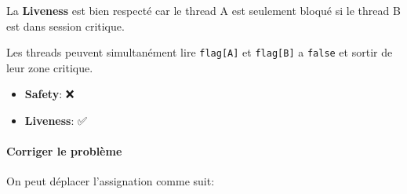 \begin{Shaded}
\begin{Highlighting}[]
 \OperatorTok{(}\OperatorTok{[}\OperatorTok{]==}\OperatorTok{)} \OperatorTok{\{}
\OperatorTok{\}}
\OperatorTok{[}\OperatorTok{]=}\OperatorTok{;}
\OperatorTok{();}
\OperatorTok{[}\OperatorTok{]=}\OperatorTok{;}

 \OperatorTok{(}\OperatorTok{[}\OperatorTok{]==}\OperatorTok{)} \OperatorTok{\{} 
\OperatorTok{\}} 
\OperatorTok{[}\OperatorTok{]=}\OperatorTok{;}
\OperatorTok{();}
\OperatorTok{[}\OperatorTok{]=}\OperatorTok{;}
\end{Highlighting}
\end{Shaded}

La \textbf{Liveness} est bien respecté car le thread A est seulement
bloqué si le thread B est dans session critique.

Les threads peuvent simultanément lire \texttt{flag{[}A{]}} et
\texttt{flag{[}B{]}} a \texttt{false} et sortir de leur zone critique.

\begin{itemize}
\tightlist
\item
  \textbf{Safety}: ❌
\item
  \textbf{Liveness}: ✅
\end{itemize}

\paragraph{Corriger le problème}\label{corriger-le-probluxe8me}

On peut déplacer l'assignation comme suit:

\begin{Shaded}
\begin{Highlighting}[]
\OperatorTok{[}\OperatorTok{]=}\OperatorTok{;} 
 \OperatorTok{(}\OperatorTok{[}\OperatorTok{]==}\OperatorTok{)} \OperatorTok{\{} 
\OperatorTok{\}} 
\OperatorTok{();}
\OperatorTok{[}\OperatorTok{]=}\OperatorTok{;}
\end{Highlighting}
\end{Shaded}

